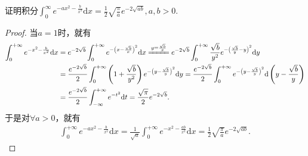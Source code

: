 \documentclass[../../main.tex]{subfiles}
\begin{document}
\begin{example}\label{example:常用定积分公式}
证明积分$\int_{0}^{\infty}e^{-ax^{2}-\frac{b}{x^{2}}}\mathrm{d}x=\frac{1}{2}\sqrt{\frac{\pi}{a}}e^{-2\sqrt{ab}},a,b>0.$
\end{example}
\begin{proof}
当\(a=1\)时，就有
\begin{align*}
\int_0^{+\infty}{e^{-x^2-\frac{b}{x^2}}\mathrm{d}x}&=e^{-2\sqrt{b}}\int_0^{+\infty}{e^{-\left( x-\frac{\sqrt{b}}{x} \right) ^2}\mathrm{d}x}\xlongequal{y=\frac{\sqrt{b}}{x}}e^{-2\sqrt{b}}\int_0^{+\infty}{\frac{\sqrt{b}}{y^2}e^{-\left( \frac{\sqrt{b}}{y}-y \right) ^2}\mathrm{d}y}\nonumber\\
&=\frac{e^{-2\sqrt{b}}}{2}\int_0^{+\infty}{\left( 1+\frac{\sqrt{b}}{y^2} \right) e^{-\left( y-\frac{\sqrt{b}}{y} \right) ^2}\mathrm{d}y}=\frac{e^{-2\sqrt{b}}}{2}\int_0^{+\infty}{e^{-\left( y-\frac{\sqrt{b}}{y} \right) ^2}\mathrm{d}\left( y-\frac{\sqrt{b}}{y} \right)}\nonumber\\
&=\frac{e^{-2\sqrt{b}}}{2}\int_{-\infty}^{+\infty}{e^{-t^2}\mathrm{d}t}=\frac{\sqrt{\pi}}{2}e^{-2\sqrt{b}}.
\end{align*}
于是对\(\forall a>0\)，就有
\begin{align*}
\int_0^{+\infty}{e^{-ax^2-\frac{b}{x^2}}\mathrm{d}x}=\frac{1}{\sqrt{a}}\int_0^{+\infty}{e^{-x^2-\frac{ab}{x^2}}\mathrm{d}x}=\frac{1}{2}\sqrt{\frac{\pi}{a}}e^{-2\sqrt{ab}}.
\end{align*}

\end{proof}
\end{document}
